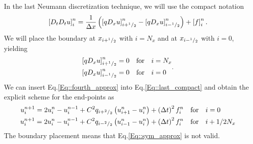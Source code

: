 \documentclass[11pt]{article}
\begin{document}
In the last Neumann discretization technique, we will use the compact notation 
\begin{equation}
\left[ D_t D_t u \right]\sp{n}_i = \frac{1}{\Delta x}\left(\left[q D_x u \right]_{i+\sp{1}/_2}\sp{n}  -\left[q D_x u \right]_{i-\sp{1}/_2}\sp{n} \right) + \left[ f \right]\sp{n}_i.
\label{Eq::last_compact}
\end{equation}
We will place the boundary at $x_{i+\sp{1}/_2}$ with $i=N_x$ and at  $x_{i-\sp{1}/_2}$ with $i=0$, yielding 
\begin{equation}
\begin{aligned}
  \left[q D_x u \right]_{i+\sp{1}/_2}\sp{n} &= 0 \quad \text{for} \quad i = N_x \\
  \left[q D_x u \right]_{i-\sp{1}/_2}\sp{n} &= 0 \quad \text{for} \quad i = 0
\end{aligned}.
\label{Eq::fourth_approx}
\end{equation}
We can insert Eq.\ref{Eq::fourth_approx} into Eq.\ref{Eq::last_compact} and obtain the explicit scheme for the end-points as
\begin{equation}
\begin{aligned}
u\sp{n+1}_i  =  2u\sp{n}_i-u\sp{n-1}_i + C\sp{2}q_{i+\sp{2}/_{2}}  \left( u\sp{n}_{i+1} -u\sp{n}_{i} \right)  +  \left(\Delta t\right)\sp{2}f\sp{n}_i & \quad \text{for} \quad i = 0 \\
 u\sp{n+1}_i  =  2u\sp{n}_i-u\sp{n-1}_i + C\sp{2}q_{i-\sp{2}/_{2}}  \left( u\sp{n}_{i-1} -u\sp{n}_{i} \right)  +  \left(\Delta t\right)\sp{2}f\sp{n}_i & \quad \text{for} \quad i+1/2  N_x 				
\end{aligned}
\label{Eq::Last_scheme}
\end{equation}
The boundary placement means that Eq.\ref{Eq::sym_approx} is not valid.
\end{document}
